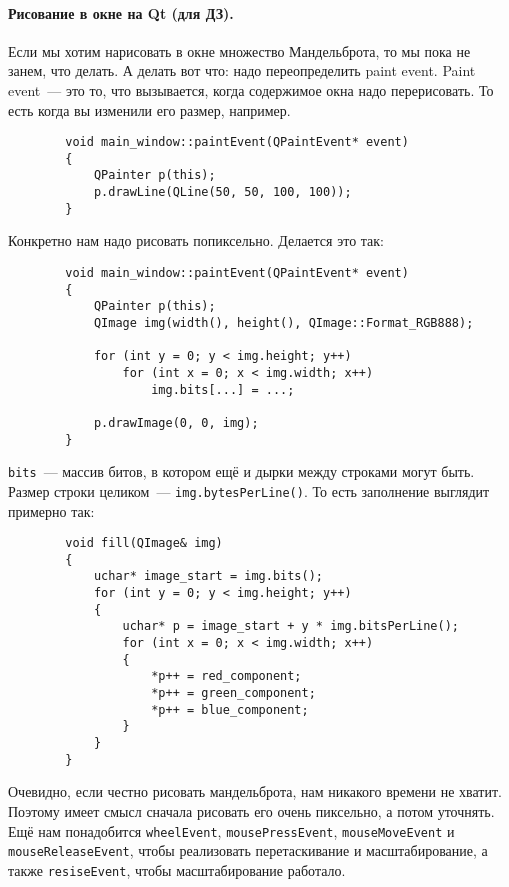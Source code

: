 \documentclass{article}
\begin{document}
    \paragraph{Рисование в окне на Qt (для ДЗ).}
    Если мы хотим нарисовать в окне множество Мандельброта, то мы пока не занем, что делать. А делать вот что: надо переопределить paint event. Paint event~--- это то, что вызывается, когда содержимое окна надо перерисовать. То есть когда вы изменили его размер, например.
    \begin{verbatim}
        void main_window::paintEvent(QPaintEvent* event)
        {
            QPainter p(this);
            p.drawLine(QLine(50, 50, 100, 100));
        }
    \end{verbatim}
    Конкретно нам надо рисовать попиксельно. Делается это так:
    \begin{verbatim}
        void main_window::paintEvent(QPaintEvent* event)
        {
            QPainter p(this);
            QImage img(width(), height(), QImage::Format_RGB888);

            for (int y = 0; y < img.height; y++)
                for (int x = 0; x < img.width; x++)
                    img.bits[...] = ...;

            p.drawImage(0, 0, img);
        }
    \end{verbatim}
    \texttt{bits}~--- массив битов, в котором ещё и дырки между строками могут быть. Размер строки целиком~--- \texttt{img.bytesPerLine()}. То есть заполнение выглядит примерно так:
    \begin{verbatim}
        void fill(QImage& img)
        {
            uchar* image_start = img.bits();
            for (int y = 0; y < img.height; y++)
            {
                uchar* p = image_start + y * img.bitsPerLine();
                for (int x = 0; x < img.width; x++)
                {
                    *p++ = red_component;
                    *p++ = green_component;
                    *p++ = blue_component;
                }
            }
        }
    \end{verbatim}
    Очевидно, если честно рисовать мандельброта, нам никакого времени не хватит. Поэтому имеет смысл сначала рисовать его очень пиксельно, а потом уточнять.\\
    Ещё нам понадобится \texttt{wheelEvent}, \texttt{mousePressEvent}, \texttt{mouseMoveEvent} и \texttt{mouseReleaseEvent}, чтобы реализовать перетаскивание и масштабирование, а также \texttt{resiseEvent}, чтобы масштабирование работало.
\end{document}
